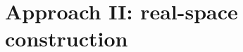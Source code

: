 \documentclass[xcolor=table, 11pt, aspectratio=169]{beamer}
\begin{document}

\section{Approach II: real-space construction}
\end{document}
